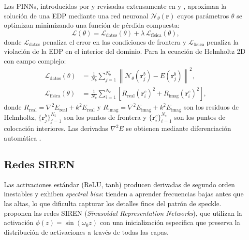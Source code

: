 Las PINNs, introducidas por \citet{Raissi2019_PINNs} y revisadas extensamente en
\citet{Karniadakis2021_review} y \citet{Cuomo2022_review}, aproximan la solución de una
EDP mediante una red neuronal $\mathcal{N}_\theta(\mathbf{r})$ cuyos parámetros $\theta$
se optimizan minimizando una función de pérdida compuesta:
%
\begin{equation}
  \mathcal{L}(\theta) = \mathcal{L}_{\mathrm{datos}}(\theta)
                      + \lambda\,\mathcal{L}_{\mathrm{física}}(\theta),
  \label{eq:loss_total}
\end{equation}
%
donde $\mathcal{L}_{\mathrm{datos}}$ penaliza el error en las condiciones de frontera y
$\mathcal{L}_{\mathrm{física}}$ penaliza la violación de la EDP en el interior del dominio.
Para la ecuación de Helmholtz 2D con campo complejo:
%
\begin{align}
  \mathcal{L}_{\mathrm{datos}}(\theta) &=
    \frac{1}{N_b}\sum_{j=1}^{N_b}
    \left\|\mathcal{N}_\theta(\mathbf{r}_j^b) - E(\mathbf{r}_j^b)\right\|^2,
  \label{eq:loss_datos} \\
  \mathcal{L}_{\mathrm{física}}(\theta) &=
    \frac{1}{N_c}\sum_{i=1}^{N_c}
    \left[R_{\mathrm{real}}(\mathbf{r}_i^c)^2 + R_{\mathrm{imag}}(\mathbf{r}_i^c)^2\right],
  \label{eq:loss_fisica}
\end{align}
%
donde $R_{\mathrm{real}} = \nabla^2 E_{\mathrm{real}} + k^2 E_{\mathrm{real}}$ y
$R_{\mathrm{imag}} = \nabla^2 E_{\mathrm{imag}} + k^2 E_{\mathrm{imag}}$ son los
residuos de Helmholtz, $\{\mathbf{r}_j^b\}_{j=1}^{N_b}$ son los puntos de frontera
y $\{\mathbf{r}_i^c\}_{i=1}^{N_c}$ son los puntos de colocación interiores.
Las derivadas $\nabla^2 E$ se obtienen mediante diferenciación automática \citep{Baydin2018_autodiff}.

\subsection{Redes SIREN}
\label{subsec:siren}

Las activaciones estándar (ReLU, tanh) producen derivadas de segundo orden inestables y
exhiben \textit{spectral bias}: tienden a aprender frecuencias bajas antes que las altas,
lo que dificulta capturar los detalles finos del patrón de speckle.
\citet{Sitzmann2020_SIREN} proponen las redes SIREN (\textit{Sinusoidal Representation
Networks}), que utilizan la activación $\phi(z) = \sin(\omega_0 z)$ con una inicialización
específica que preserva la distribución de activaciones a través de todas las capas.

